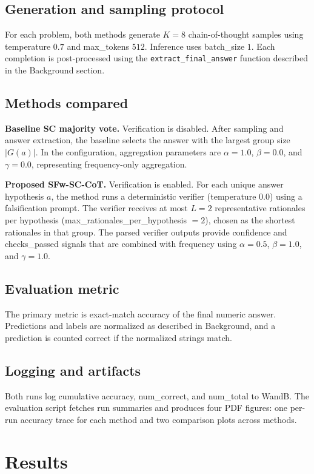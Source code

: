 \documentclass[journal,article,accept,pdftex,moreauthors]{Definitions/mdpi}
\begin{document}
\subsection{Generation and sampling protocol}
For each problem, both methods generate $K = 8$ chain-of-thought samples using temperature $0.7$ and max\_tokens $512$. Inference uses batch\_size $1$. Each completion is post-processed using the \texttt{extract\_final\_answer} function described in the Background section.

\subsection{Methods compared}
\textbf{Baseline SC majority vote.} Verification is disabled. After sampling and answer extraction, the baseline selects the answer with the largest group size $|G(a)|$. In the configuration, aggregation parameters are $\alpha = 1.0$, $\beta = 0.0$, and $\gamma = 0.0$, representing frequency-only aggregation.

\textbf{Proposed SFw-SC-CoT.} Verification is enabled. For each unique answer hypothesis $a$, the method runs a deterministic verifier (temperature $0.0$) using a falsification prompt. The verifier receives at most $L = 2$ representative rationales per hypothesis (max\_rationales\_per\_hypothesis $= 2$), chosen as the shortest rationales in that group. The parsed verifier outputs provide confidence and checks\_passed signals that are combined with frequency using $\alpha = 0.5$, $\beta = 1.0$, and $\gamma = 1.0$.

\subsection{Evaluation metric}
The primary metric is exact-match accuracy of the final numeric answer. Predictions and labels are normalized as described in Background, and a prediction is counted correct if the normalized strings match.

\subsection{Logging and artifacts}
Both runs log cumulative accuracy, num\_correct, and num\_total to WandB. The evaluation script fetches run summaries and produces four PDF figures: one per-run accuracy trace for each method and two comparison plots across methods.

\section{Results}
\end{document}
